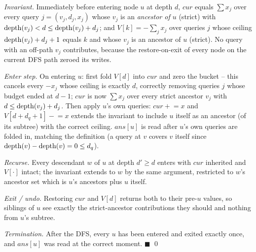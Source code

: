 \begin{proofbox}
\emph{Invariant.} Immediately before entering node $u$ at depth $d$,
$\mathit{cur}$ equals $\sum x_j$ over every query $j=(v_j,d_j,x_j)$
whose $v_j$ is an \emph{ancestor of $u$} (strict) with
$\operatorname{depth}(v_j) < d \le \operatorname{depth}(v_j) + d_j$; and $\mathit{V}[k]= -\sum_j x_j$
over queries $j$ whose ceiling $\operatorname{depth}(v_j)+d_j+1$ equals $k$ and whose
$v_j$ is an ancestor of $u$ (strict). No query with an off-path $v_j$
contributes, because the restore-on-exit of every node on the current
DFS path zeroed its writes.

\emph{Enter step.} On entering $u$: first fold $\mathit{V}[d]$ into
$\mathit{cur}$ and zero the bucket -- this cancels every $-x_j$ whose
ceiling is exactly $d$, correctly removing queries $j$ whose budget
ended at $d-1$; $\mathit{cur}$ is now $\sum x_j$ over every strict
ancestor $v_j$ with $d \le \operatorname{depth}(v_j) + d_j$. Then apply $u$'s own
queries: $\mathit{cur}\mathrel{+}=x$ and
$\mathit{V}[d+d_q+1]\mathrel{-}=x$ extends the invariant to include $u$
itself as an ancestor (of its subtree) with the correct ceiling.
$\mathit{ans}[u]$ is read after $u$'s own queries are folded in,
matching the definition (a query at $v$ covers $v$ itself since
$\operatorname{depth}(v) - \operatorname{depth}(v) = 0 \le d_q$).

\emph{Recurse.} Every descendant $w$ of $u$ at depth $d' \ge d$ enters
with $\mathit{cur}$ inherited and $\mathit{V}[\cdot]$ intact; the
invariant extends to $w$ by the same argument, restricted to $w$'s
ancestor set which is $u$'s ancestors plus $u$ itself.

\emph{Exit / undo.} Restoring $\mathit{cur}$ and $\mathit{V}[d]$
returns both to their pre-$u$ values, so siblings of $u$ see exactly
the strict-ancestor contributions they should and nothing from $u$'s
subtree.

\emph{Termination.} After the DFS, every $u$ has been entered and
exited exactly once, and $\mathit{ans}[u]$ was read at the correct
moment. $\blacksquare$ \qed
\end{proofbox}

